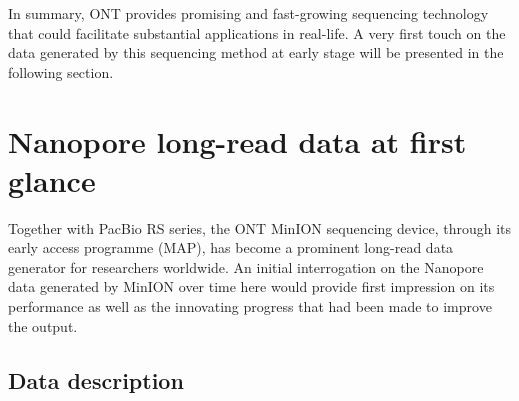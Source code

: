 In summary, ONT provides promising and fast-growing sequencing technology that could facilitate substantial applications in real-life.
A very first touch on the data generated by this sequencing method at early stage will be presented in the following section.
\section{Nanopore long-read data at first glance}

Together with PacBio RS series, the ONT MinION sequencing device, through its early access programme (MAP), has become a prominent long-read data generator for researchers worldwide. 
An initial interrogation on the Nanopore data generated by MinION over time here would provide first impression on its performance as well as the innovating progress that had been made to improve the output. 

\subsection{Data description}


